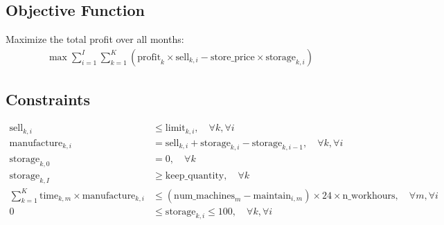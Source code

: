 \documentclass{article}
\begin{document}
\subsection*{Objective Function}
Maximize the total profit over all months:
\begin{align*}
    \max \sum_{i=1}^{I} \sum_{k=1}^{K} \left( \text{profit}_k \times \text{sell}_{k,i} - \text{store\_price} \times \text{storage}_{k,i} \right)
\end{align*}

\subsection*{Constraints}
\begin{align*}
    \text{sell}_{k,i} & \leq \text{limit}_{k,i}, \quad \forall k, \forall i \\
    \text{manufacture}_{k,i} & = \text{sell}_{k,i} + \text{storage}_{k,i} - \text{storage}_{k,i-1}, \quad \forall k, \forall i \\
    \text{storage}_{k,0} & = 0, \quad \forall k \\
    \text{storage}_{k,I} & \geq \text{keep\_quantity}, \quad \forall k \\
    \sum_{k=1}^{K} \text{time}_{k,m} \times \text{manufacture}_{k,i} & \leq \left( \text{num\_machines}_m - \text{maintain}_{i,m} \right) \times 24 \times \text{n\_workhours}, \quad \forall m, \forall i \\
    0 & \leq \text{storage}_{k,i} \leq 100, \quad \forall k, \forall i
\end{align*}
\end{document}
